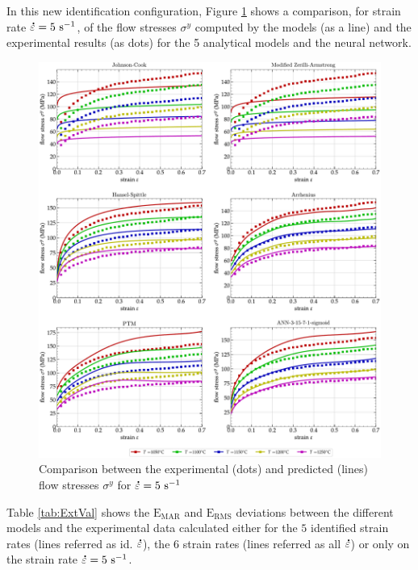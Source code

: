 \documentclass[metals,article,submit,pdftex,moreauthors]{Definitions/mdpi}
\DeclareRobustCommand{\mdot}[1]{\accentset{\mbox{\bfseries .}}{#1}}
\DeclareRobustCommand{\RMSE}{\text{E}_\text{RMS}}
\DeclareRobustCommand{\MARE}{\text{E}_\text{MAR}}
\DeclareRobustCommand{\ps}{\text{s}^{-1}}
\begin{document}
In this new identification configuration, Figure \ref{fig:CompExt} shows a comparison, for strain rate $\mdot\varepsilon=5~\ps$, of the flow stresses $\sigma^y$ computed by the models (as a line) and the experimental results (as dots) for the 5 analytical models and the neural network.
\begin{figure}[!ht]
\centering
\includegraphics[width=\columnwidth]
{Figures/CompExt}
\caption{Comparison between the experimental (dots) and predicted (lines) flow stresses $\sigma^y$ for $\mdot\varepsilon=5~\ps$}
\label{fig:CompExt}
\end{figure}
Table \ref{tab:ExtVal} shows the $\MARE$ and $\RMSE$ deviations between the different models and the experimental data calculated either for the $5$ identified strain rates (lines referred as id. $\mdot\varepsilon$), the $6$ strain rates (lines referred as all $\mdot\varepsilon$) or only on the strain rate $\mdot\varepsilon=5~\ps$.
\end{document}
